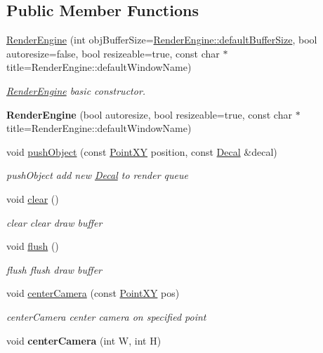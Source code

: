 \subsection*{Public Member Functions}
\begin{DoxyCompactItemize}
\item 
\hyperlink{classRenderEngine_a31ae68425b2e62e0e1f427fe7e2c1a75}{Render\+Engine} (int obj\+Buffer\+Size=\hyperlink{classRenderEngine_a9dc4537015d6db0e13cf78364caacddf}{Render\+Engine\+::default\+Buffer\+Size}, bool autoresize=false, bool resizeable=true, const char $\ast$title=Render\+Engine\+::default\+Window\+Name)
\begin{DoxyCompactList}\small\item\em \hyperlink{classRenderEngine}{Render\+Engine} basic constructor. \end{DoxyCompactList}\item 
\hypertarget{classRenderEngine_a310e9e1d0a3f9bf46e8fe37b0acea878}{}{\bfseries Render\+Engine} (bool autoresize, bool resizeable=true, const char $\ast$title=Render\+Engine\+::default\+Window\+Name)\label{classRenderEngine_a310e9e1d0a3f9bf46e8fe37b0acea878}

\item 
void \hyperlink{classRenderEngine_ae737efb1b6933f10aa12b991a3deb1fa}{push\+Object} (const \hyperlink{classPointXY}{Point\+X\+Y} position, const \hyperlink{classDecal}{Decal} \&decal)
\begin{DoxyCompactList}\small\item\em push\+Object add new \hyperlink{classDecal}{Decal} to render queue \end{DoxyCompactList}\item 
\hypertarget{classRenderEngine_ab09f2455f3da1dddc07b478405f8f01b}{}void \hyperlink{classRenderEngine_ab09f2455f3da1dddc07b478405f8f01b}{clear} ()\label{classRenderEngine_ab09f2455f3da1dddc07b478405f8f01b}

\begin{DoxyCompactList}\small\item\em clear clear draw buffer \end{DoxyCompactList}\item 
\hypertarget{classRenderEngine_a4e56228f0972018bc593e5d62da83f1d}{}void \hyperlink{classRenderEngine_a4e56228f0972018bc593e5d62da83f1d}{flush} ()\label{classRenderEngine_a4e56228f0972018bc593e5d62da83f1d}

\begin{DoxyCompactList}\small\item\em flush flush draw buffer \end{DoxyCompactList}\item 
void \hyperlink{classRenderEngine_a99306b968abe7132a853513e9b2046b2}{center\+Camera} (const \hyperlink{classPointXY}{Point\+X\+Y} pos)
\begin{DoxyCompactList}\small\item\em center\+Camera center camera on specified point \end{DoxyCompactList}\item 
\hypertarget{classRenderEngine_ab146273934ea5d1b3f76dd21c456570c}{}void {\bfseries center\+Camera} (int W, int H)\label{classRenderEngine_ab146273934ea5d1b3f76dd21c456570c}


\end{DoxyCompactItemize}
